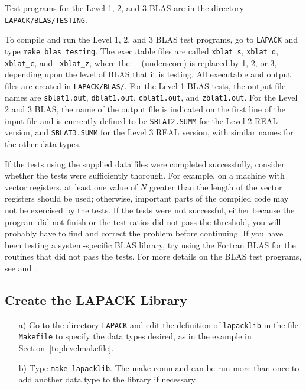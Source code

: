 \dent
Test programs for the Level 1, 2, and 3 BLAS are in the directory 
{\tt LAPACK/BLAS/TESTING}.

To compile and run the Level 1, 2, and 3 BLAS test programs,
go to {\tt LAPACK} and type {\tt make blas\_testing}.  The executable
files are called {\tt xblat\_s}, {\tt xblat\_d}, {\tt xblat\_c}, and {\tt
xblat\_z}, where the \_ (underscore) is replaced by 1, 2, or 3,
depending upon the level of BLAS that it is testing.  All executable and
output files are created in {\tt LAPACK/BLAS/}.
For the Level 1 BLAS tests, the output file names are {\tt sblat1.out},
{\tt dblat1.out}, {\tt cblat1.out}, and {\tt zblat1.out}.  For the Level
2 and 3 BLAS, the name of the output file is indicated on the first line of the
input file and is currently defined to be {\tt SBLAT2.SUMM} for
the Level 2 REAL version, and {\tt SBLAT3.SUMM} for the Level 3 REAL
version, with similar names for the other data types.

If the tests using the supplied data files were completed successfully,
consider whether the tests were sufficiently thorough.
For example, on a machine with vector registers, at least one value
of $N$ greater than the length of the vector registers should be used;
otherwise, important parts of the compiled code may not be
exercised by the tests. 
If the tests were not successful, either because the program did not
finish or the test ratios did not pass the threshold, you will
probably have to find and correct the problem before continuing. 
If you have been testing a system-specific
BLAS library, try using the Fortran BLAS for the routines that
did not pass the tests.
For more details on the BLAS test programs, 
see \cite{BLAS2-test} and \cite{BLAS3-test}.

\subsection{Create the LAPACK Library}

\begin{itemize}
\item[a)]
Go to the directory {\tt LAPACK} and edit the definition of
{\tt lapacklib} in the file {\tt Makefile} to specify the data types desired,
as in the example in Section~\ref{toplevelmakefile}.

\item[b)]
Type {\tt make lapacklib}.
The make command can be run more than once to add another
data type to the library if necessary.  

\end{itemize}


